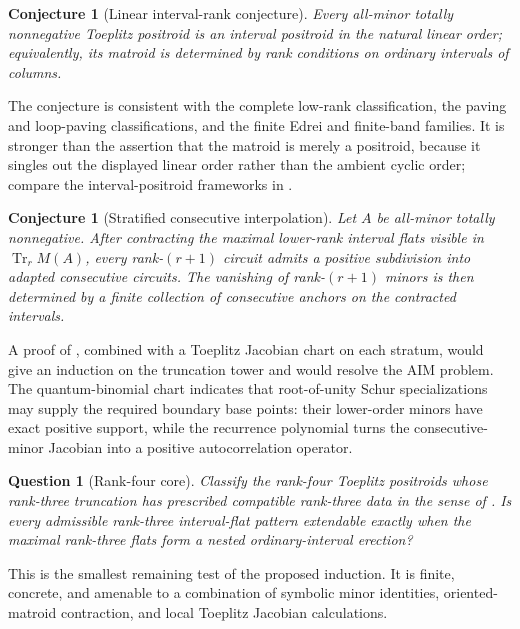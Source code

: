 \documentclass[11pt]{amsart}
\newtheorem{conjecture}[theorem]{Conjecture}
\newtheorem{question}[theorem]{Question}
\theoremstyle{definition}
\theoremstyle{remark}
\newcommand{\Tr}{\operatorname{Tr}}
\begin{document}
\begin{conjecture}[Linear interval-rank conjecture]\label{conj:interval-rank}
Every all-minor totally nonnegative Toeplitz positroid is an interval positroid in the natural linear order; equivalently, its matroid is determined by rank conditions on ordinary intervals of columns.
\end{conjecture}

The conjecture is consistent with the complete low-rank classification, the paving and loop-paving classifications, and the finite Edrei and finite-band families.  It is stronger than the assertion that the matroid is merely a positroid, because it singles out the displayed linear order rather than the ambient cyclic order; compare the interval-positroid frameworks in \cite{Knutson,Park}.

\begin{conjecture}[Stratified consecutive interpolation]\label{conj:stratified-interpolation}
Let $A$ be all-minor totally nonnegative.  After contracting the maximal lower-rank interval flats visible in $\Tr_rM(A)$, every rank-$(r+1)$ circuit admits a positive subdivision into adapted consecutive circuits.  The vanishing of rank-$(r+1)$ minors is then determined by a finite collection of consecutive anchors on the contracted intervals.
\end{conjecture}

A proof of , combined with a Toeplitz Jacobian chart on each stratum, would give an induction on the truncation tower and would resolve the AIM problem.  The quantum-binomial chart indicates that root-of-unity Schur specializations may supply the required boundary base points: their lower-order minors have exact positive support, while the recurrence polynomial turns the consecutive-minor Jacobian into a positive autocorrelation operator.

\begin{question}[Rank-four core]
Classify the rank-four Toeplitz positroids whose rank-three truncation has prescribed compatible rank-three data in the sense of \cite{CGQlow}.  Is every admissible rank-three interval-flat pattern extendable exactly when the maximal rank-three flats form a nested ordinary-interval erection?
\end{question}

This is the smallest remaining test of the proposed induction.  It is finite, concrete, and amenable to a combination of symbolic minor identities, oriented-matroid contraction, and local Toeplitz Jacobian calculations.
\end{document}
